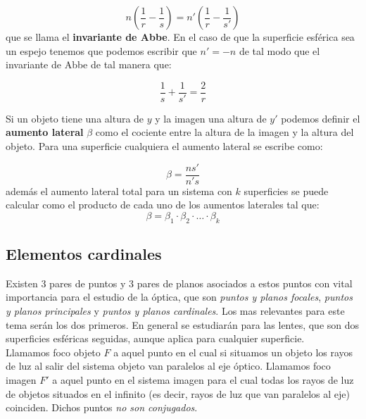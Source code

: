 \documentclass[12pt]{article}
\newcommand{\parentesis}[1]{\left( #1  \right)}
\numberwithin{equation}{section}
\numberwithin{figure}{section}
\begin{document}
\begin{equation}
n \parentesis{\dfrac{1}{r}-\dfrac{1}{s}} = n' \parentesis{\dfrac{1}{r}-\dfrac{1}{s'}}
\end{equation}
que se llama el \textbf{invariante de Abbe}. En el caso de que la superficie esférica sea un espejo tenemos que podemos escribir que $n' = -n$ de tal modo que el invariante de Abbe de tal manera que:

\begin{equation}
\dfrac{1}{s} + \dfrac{1}{s'} = \dfrac{2}{r}
\end{equation} 

Si un objeto tiene una altura de $y$ y la imagen una altura de $y'$ podemos definir el \textbf{aumento lateral} $\beta$ como el cociente entre la altura de la imagen y la altura del objeto. Para una superficie cualquiera el aumento lateral se escribe como:

\begin{equation}
\beta = \dfrac{n s'}{n' s}
\end{equation}
además el aumento lateral total para un sistema con $k$ superficies se puede calcular como el producto de cada uno de los aumentos laterales tal que:
\begin{equation}
\beta = \beta_1 \cdot \beta_2 \cdot \ldots \cdot \beta_k
\end{equation}



\subsection{Elementos cardinales}

Existen 3 pares de puntos y 3 pares de planos asociados a estos puntos con vital importancia para el estudio de la óptica, que son \textit{puntos y planos focales}, \textit{puntos y planos principales} y \textit{puntos y planos cardinales}. Los mas relevantes para este tema serán los dos primeros. En general se estudiarán para las lentes, que son dos superficies esféricas seguidas, aunque aplica para cualquier superficie. \\

Llamamos foco objeto $F$ a aquel punto en el cual si situamos un objeto los rayos de luz al salir del sistema objeto van paralelos al eje óptico. Llamamos foco imagen $F'$ a aquel punto en el sistema imagen para el cual todas los rayos de luz de objetos situados en el infinito (es decir, rayos de luz que van paralelos al eje) coinciden. Dichos puntos \textit{no son conjugados}.  \\
\end{document}
